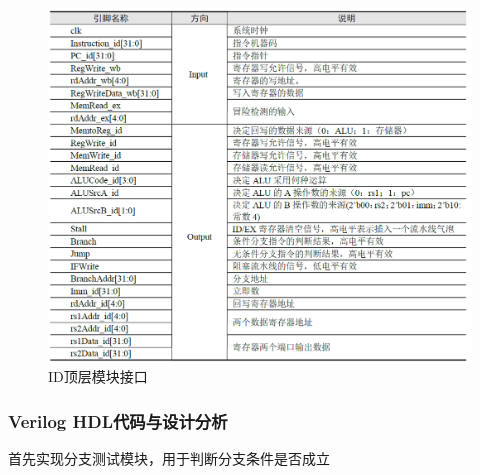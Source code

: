 \documentclass[12pt,hyperref,a4paper,UTF8]{ctexart}
\begin{document}
\begin{figure}[H]
    \centering
    \includegraphics[width=1\textwidth]{figures/fig/image7.png}
    \caption{ID顶层模块接口}
\end{figure}

\subsubsection*{\Large Verilog HDL代码与设计分析}
\normalsize

首先实现分支测试模块，用于判断分支条件是否成立
\end{document}
